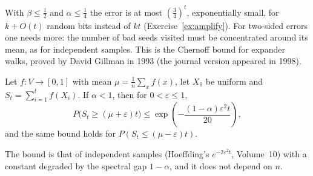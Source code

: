 With $\beta\le\frac12$ and $\alpha\le\frac14$ the error is at most $(\frac34)^t$, exponentially small, for $k+O(t)$ random bits instead of $kt$ (Exercise~\ref{ex:amplify}). For two-sided errors one needs more: the number of bad
seeds visited must be concentrated around its mean, as for independent samples. This is the Chernoff bound for expander walks, proved by David Gillman in 1993 (the journal version appeared in 1998).

\begin{theorem}\label{thm:expchernoff}
Let $f:V\to[0,1]$ with mean $\mu=\frac1n\sum_xf(x)$, let $X_0$ be uniform and $S_t=\sum_{i=1}^tf(X_i)$. If $\alpha<1$, then for $0<\varepsilon\le1$,
\[
P\bigl(S_t\ge(\mu+\varepsilon)t\bigr)\le\exp\left(-\frac{(1-\alpha)\varepsilon^2t}{20}\right),
\]
and the same bound holds for $P(S_t\le(\mu-\varepsilon)t)$.
\end{theorem}

The bound is that of independent samples (Hoeffding's $e^{-2\varepsilon^2t}$, Volume~10) with a constant degraded by the spectral gap $1-\alpha$, and it does not depend on $n$.

